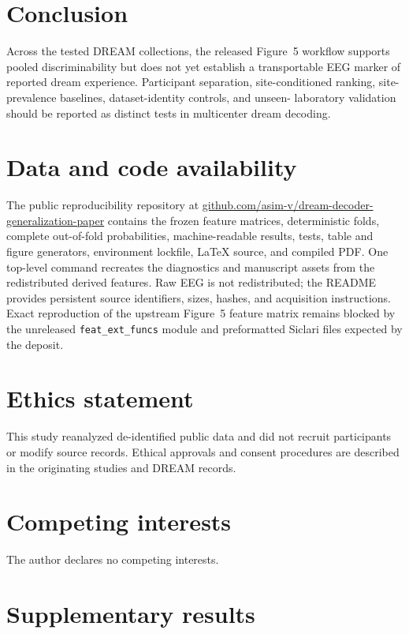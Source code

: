 \documentclass[10pt,twocolumn]{article}
\newcommand{\code}[1]{\texttt{#1}}
\begin{document}
\section{Conclusion}

Across the tested DREAM collections, the released Figure~5 workflow supports
pooled discriminability but does not yet establish a transportable EEG marker
of reported dream experience. Participant separation, site-conditioned
ranking, site-prevalence baselines, dataset-identity controls, and unseen-
laboratory validation should be reported as distinct tests in multicenter
dream decoding.

\section*{Data and code availability}

The public reproducibility repository at
\href{https://github.com/asim-v/dream-decoder-generalization-paper}{github.com/asim-v/dream-decoder-generalization-paper}
contains the frozen feature matrices, deterministic folds, complete out-of-fold
probabilities, machine-readable results, tests, table and figure generators,
environment lockfile, LaTeX source, and compiled PDF. One top-level command
recreates the diagnostics and manuscript assets from the redistributed derived
features. Raw EEG is not redistributed; the README provides persistent source
identifiers, sizes, hashes, and acquisition instructions. Exact reproduction
of the upstream Figure~5 feature matrix remains blocked by the unreleased
\code{feat\_ext\_funcs} module and preformatted Siclari files expected by the
deposit.

\section*{Ethics statement}

This study reanalyzed de-identified public data and did not recruit
participants or modify source records. Ethical approvals and consent
procedures are described in the originating studies and DREAM records.

\section*{Competing interests}

The author declares no competing interests.

\clearpage
\appendix
\onecolumn
\section{Supplementary results}
\end{document}
